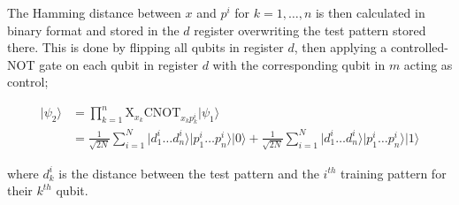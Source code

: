 The Hamming distance between $x$ and $p^i$ for $k=1,\dots, n$ is then calculated in binary format and stored in the $d$ register overwriting the test pattern stored there. This is done by flipping all qubits in register $d$, then applying a controlled-NOT gate on each qubit in register $d$ with the corresponding qubit in $m$ acting as control;

\begin{align*}
    \vert \psi_2 \rangle &= \prod\limits_{k=1}^{n}\textrm{X}_{x_k} \textrm{CNOT}_{x_{k}p_{k}^{i}} \vert \psi_1 \rangle\\
    &= \frac{1}{\sqrt{2N}}\sum\limits_{i=1}^{N} \vert d_1^i\dots d_n^i\rangle\vert p_{1}^{i}\dots p_{n}^{i}\rangle \vert 0 \rangle + \frac{1}{\sqrt{2N}}\sum\limits_{i=1}^{N} \vert d_1^i\dots d_n^i\rangle\vert p_{1}^{i}\dots p_{n}^{i}\rangle \vert 1 \rangle
\end{align*}

\noindent where $d_k^i$ is the distance between the test pattern and the $i^{th}$ training pattern for their $k^{th}$ qubit.